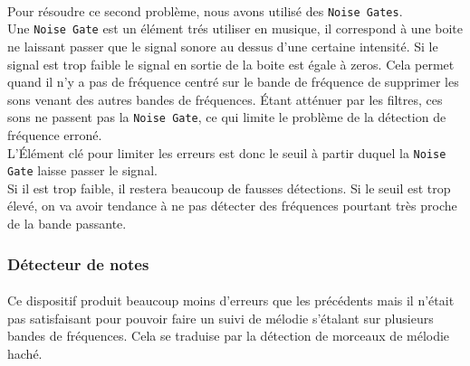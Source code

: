 \documentclass[a4paper, titlepage, oneside, 12pt]{article}%
\begin{document}
\paragraph{}
Pour résoudre ce second problème, nous avons utilisé des \texttt{Noise Gates}.\\
Une \texttt{Noise Gate} est un élément trés utiliser en musique, il correspond à une boite ne laissant passer que le signal sonore au dessus d'une certaine intensité. Si le signal est trop faible le signal en sortie de la boite est égale à zeros.
Cela permet quand il n'y a pas de fréquence centré sur le bande de fréquence de supprimer les sons venant des autres bandes de fréquences. Étant atténuer par les filtres, ces sons ne passent pas la \texttt{Noise Gate}, ce qui limite le problème de la détection de fréquence erroné.\\
L’Élément clé pour limiter les erreurs est donc le seuil à partir duquel la \texttt{Noise Gate} laisse passer le signal.\\ Si il est trop faible, il restera beaucoup de fausses détections. Si le seuil est trop élevé, on va avoir tendance à ne pas détecter des fréquences pourtant très proche de la bande passante.

\subsubsection{Détecteur de notes}
\paragraph{}
Ce dispositif produit beaucoup moins d'erreurs que les précédents mais il n'était pas satisfaisant pour pouvoir faire un suivi de mélodie s'étalant sur plusieurs bandes de fréquences. Cela se traduise par la détection de morceaux de mélodie haché.
\end{document}

